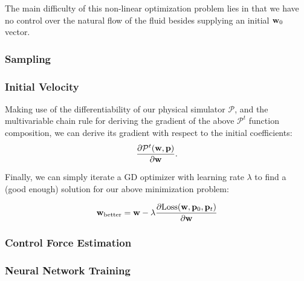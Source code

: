 The main difficulty of this non-linear optimization problem lies in that we have
no control over the natural flow of the fluid besides supplying an initial
$\vb{w}_0$ vector.

\subsubsection*{Sampling}



\subsubsection{Initial Velocity}
Making use of the differentiability of our physical simulator $\mathcal{P}$, and
the multivariable chain rule for deriving the gradient of the above
$\mathcal{P}^t$ function composition, we can derive its gradient with respect to
the initial coefficients: $$\frac{\partial
\mathcal{P}^t(\vb{w},\vb{p})}{\partial \vb{w}}.$$

Finally, we can simply iterate a \ac{GD} optimizer with learning rate $\lambda$
to find a (good enough) solution for our above minimization problem:

$$\vb{w}_{\text{better}} = \vb{w} - \lambda
\frac{
    \partial\text{Loss}(\vb{w}, \vb{p}_0, \vb{p}_t)
}{
    \partial \vb{w}
}$$
\subsubsection{Control Force Estimation}

\subsubsection{Neural Network Training}
